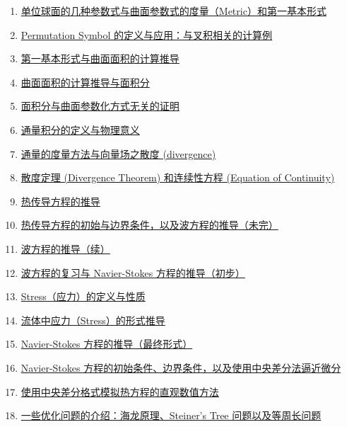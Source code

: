 \documentclass[11pt]{article}
\begin{document}
\begin{enumerate}
	\item \href{https://mp.weixin.qq.com/s/3nlAQPGKlkz6c0yGn1LR5g}{单位球面的几种参数式与曲面参数式的度量（Metric）和第一基本形式}	%
	\item \href{https://mp.weixin.qq.com/s/XZDmqEdId-iJA3TgBL-63w}{Permutation Symbol 的定义与应用：与叉积相关的计算例}	%
	\item \href{https://mp.weixin.qq.com/s/cE2Pfgp9qUYYwdypTH96Lg}{第一基本形式与曲面面积的计算推导}	%
	\item \href{https://mp.weixin.qq.com/s/K4rIHfZbbOlSgWI2b3EEpQ}{曲面面积的计算推导与面积分}	%
	\item \href{https://mp.weixin.qq.com/s/l9nzi06O_qCEVoef10zruw}{面积分与曲面参数化方式无关的证明}	%
	\item \href{https://mp.weixin.qq.com/s/-B0gHiXF7RnESR2-uq5hLA}{通量积分的定义与物理意义}	%
	\item \href{https://mp.weixin.qq.com/s/BeFLoDnLU4Yc_GO0WgmsbQ}{通量的度量方法与向量场之散度 (divergence)}	%
	\item \href{https://mp.weixin.qq.com/s/vCm1Gcp9OktxKqW_yboyOg}{散度定理 (Divergence Theorem) 和连续性方程 (Equation of Continuity)}	%
	\item \href{https://mp.weixin.qq.com/s/AjH4zivzHXw4cYxPH8FQcw}{热传导方程的推导}	%
	\item \href{https://mp.weixin.qq.com/s/13U-EDZc0AQt-1-gYgv48w}{热传导方程的初始与边界条件，以及波方程的推导（未完）}	%
	\item \href{https://mp.weixin.qq.com/s/muwb2_GG_7MQyXK5_nrigA}{波方程的推导（续）}	%
	\item \href{https://mp.weixin.qq.com/s/w7g6TUYYLEb6sJQ4j-PQ6A}{波方程的复习与 Navier-Stokes 方程的推导（初步）}	%
	\item \href{https://mp.weixin.qq.com/s/QdgFru1DRYB4ntc9u3VHHw}{Stress（应力）的定义与性质}	%
	\item \href{https://mp.weixin.qq.com/s/bhrKmRlhGOd0fv11S2TbGQ}{流体中应力（Stress）的形式推导}	%
	\item \href{https://mp.weixin.qq.com/s/lwIHkZGMHh-MLe2ZdjgI0Q}{Navier-Stokes 方程的推导（最终形式）}	%
	\item \href{https://mp.weixin.qq.com/s/2H4iKfqeXKGS8eP7gaIVmA}{Navier-Stokes 方程的初始条件、边界条件，以及使用中央差分法逼近微分}	%
	\item \href{https://mp.weixin.qq.com/s/le_qztF7sYUfHOcJE6Tbzw}{使用中央差分格式模拟热方程的直观数值方法}	%
	\item \href{https://mp.weixin.qq.com/s/qVVRf48fAX_bW0O6Qh6kOA}{一些优化问题的介绍：海龙原理、Steiner's Tree 问题以及等周长问题}	%

\end{enumerate}
\end{document}
